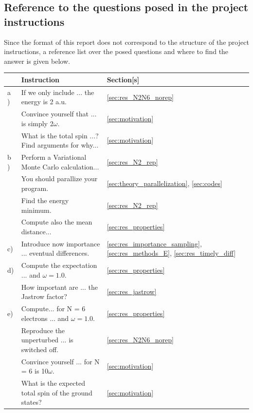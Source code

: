 \documentclass[a4paper,10pt,english]{article}
\numberwithin{figure}{subsection}
\numberwithin{table}{subsection}
\numberwithin{equation}{subsection}
\begin{document}
\clearpage
\begin{appendices}

\section{Reference to the questions posed in the project instructions}

Since the format of this report does not correspond to the structure of the project instructions, a reference list over the posed questions and where to find the answer is given below. 


\begin{table}[h!]
        \begin{tabular}{lll}
        \toprule
                        & Instruction           & Section[s] \\
        \midrule
        a )             & If we only include ... the energy is 2 a.u. &  \ref{sec:res_N2N6_norep} \\
                        & Convince yourself that ... is simply 2$\omega$. &\ref{sec:motivation} \\
                        & What is the total spin ...? Find arguments for why... &  \ref{sec:motivation} \\
        \midrule
        b )             & Perform a Variational Monte Carlo calculation...    & \ref{sec:res_N2_rep}\\
                        & You should parallize your program.         & \ref{sec:theory_parallelization}, \ref{sec:codes} \\
                        & Find the energy minimum.           & \ref{sec:res_N2_rep} \\
                        & Compute also the mean distance...    &  \ref{sec:res_properties} \\
        \midrule
        c)            & Introduce now importance ... eventual differences. & \ref{sec:res_importance_sampling}, \ref{sec:res_methods_E}, \ref{sec:res_timely_diff}\\
        \midrule 
        d)  &  Compute the expectation ... and $\omega = 1.0$. & \ref{sec:res_properties}\\
            &  How important are ... the Jastrow factor? & \ref{sec:res_jastrow}\\
        \midrule
        e) & Compute...  for N = 6 electrons ...  and $\omega = 1.0$. & \ref{sec:res_properties} \\ 
         &  Reproduce the unperturbed ... is switched off.  & \ref{sec:res_N2N6_norep} \\
         &      Convince yourself ... for N = 6 is 10$\omega$. & \ref{sec:motivation} \\
         & What is the expected total spin of the ground states? & \ref{sec:motivation} \\


\end{tabular}
\end{table}
\end{appendices}
\end{document}
